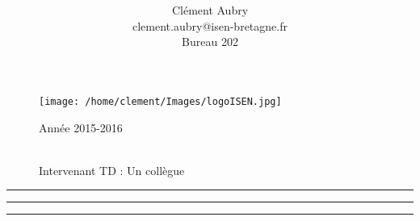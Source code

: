\documentclass[11pt, a4paper,notitlepage]{article}
\title{\longtitle\\\shorttitle}
\author{Cl\'{e}ment Aubry\\
clement.aubry@isen-bretagne.fr\\Bureau 202}
\date{\ladate}
\newif\ifanswers
\newcommand{\ladate}{2015-2016}
\def\intervenantTD{Un collègue}
\def\separateur{\FloatBarrier\begin{center}\textcolor{redisen}{\rule{0.7\linewidth}{1pt}}\end{center}\FloatBarrier}
\begin{document}
\makeatletter
\begin{figure}[!ht]
  \begin{minipage}{6cm}
    \hspace{1cm}
    \texttt{[image: /home/clement/Images/logoISEN.jpg]}
    \begin{center}\hspace{1.5cm}\textcolor{grayisen1}{Année \ladate}\end{center}
  \end{minipage}%
  \hspace{2cm}
\begin{minipage}{6cm}\begin{center}\textcolor{grayisen1}{
  \@author\\
  \vspace{0.5cm}
  Intervenant TD : \intervenantTD}
\end{center}\end{minipage}
\end{figure}
\vspace{-0.5cm}
\begin{center}\textcolor{redisen}{\rule{\linewidth}{1pt}}\end{center}\FloatBarrier
\begin{center}\huge{\textcolor{grayisen1}{\linespread{1.5}\@title}}\par\end{center}
\makeatother
\begin{center}\textcolor{redisen}{\rule{\linewidth}{1pt}}\end{center}\FloatBarrier


\ifanswers\textcolor{blue}{}\fi
\separateur

\ifanswers\textcolor{blue}{}\fi
\end{document}
